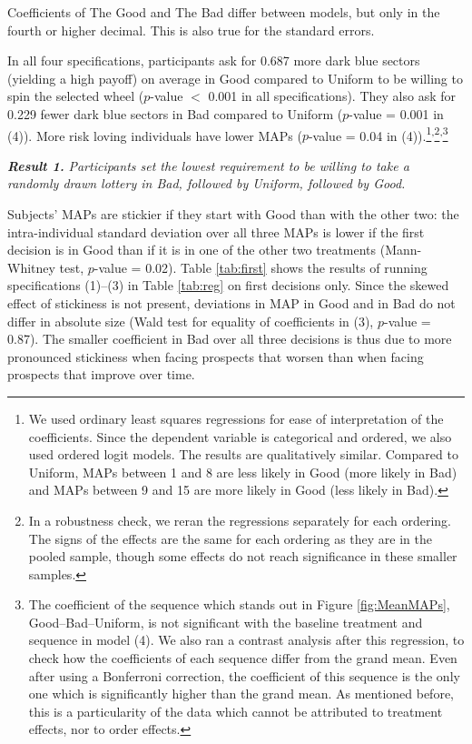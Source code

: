 \begin{table}[htbp]
\begin{adjustbox}{width=\textwidth}
\begin{threeparttable}
\begin{tablenotes}
Coefficients of The Good and The Bad differ between models, but only in the fourth or higher decimal.
This is also true for the standard errors.
\end{tablenotes}
\end{threeparttable}
\end{adjustbox}
\end{table}

In all four specifications, participants ask for 0.687 more dark blue sectors (yielding a high payoff) on average in Good compared to Uniform to be willing to spin the selected wheel ($p$-value $<$ 0.001 in all specifications).
They also ask for 0.229 fewer dark blue sectors in Bad compared to Uniform ($p$-value = 0.001 in (4)).
More risk loving individuals have lower MAPs ($p$-value = 0.04 in (4)).\footnote{
	We used ordinary least squares regressions for ease of interpretation of the coefficients.
	Since the dependent variable is categorical and ordered, we also used ordered logit models.
	The results are qualitatively similar.
	Compared to Uniform, MAPs between 1 and 8 are less likely in Good (more likely in Bad) and MAPs between 9 and 15 are more likely in Good (less likely in Bad).
}\textsuperscript{,}\footnote{
	In a robustness check, we reran the regressions separately for each ordering.
	The signs of the effects are the same for each ordering as they are in the pooled sample, though some effects do not reach significance in these smaller samples.
}\textsuperscript{,}\footnote{
The coefficient of the sequence which stands out in Figure \ref{fig:MeanMAPs}, Good--Bad--Uniform, is not significant with the baseline treatment and sequence in model (4).
We also ran a contrast analysis after this regression, to check how the coefficients of each sequence differ from the grand mean.
Even after using a Bonferroni correction, the coefficient of this sequence is the only one which is significantly higher than the grand mean.
As mentioned before, this is a particularity of the data which cannot be attributed to treatment effects, nor to order effects.
}

\textbf{\textit{Result 1.}} \textit{Participants set the lowest requirement to be willing to take a randomly drawn lottery in Bad, followed by Uniform, followed by Good.}

Subjects' MAPs are stickier if they start with Good than with the other two: the intra-individual standard deviation over all three MAPs is lower if the first decision is in Good than if it is in one of the other two treatments (Mann-Whitney test, $p$-value = 0.02).
Table \ref{tab:first} shows the results of running specifications (1)--(3) in Table \ref{tab:reg} on first decisions only.
Since the skewed effect of stickiness is not present, deviations in MAP in Good and in Bad do not differ in absolute size (Wald test for equality of coefficients in (3), $p$-value = 0.87).
The smaller coefficient in Bad over all three decisions is thus due to more pronounced stickiness when facing prospects that worsen than when facing prospects that improve over time.

